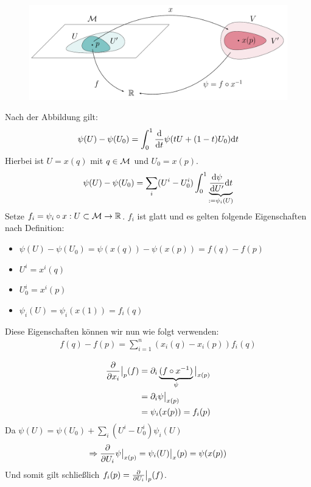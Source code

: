 \begin{bew} \leavevmode

\begin{figure}[H]
\centering
\includegraphics[width=1\linewidth]{figures/tikz/lemma_tangentialvectors.pdf}
\label{img:lemmaDarstellungBasisTPM}
\end{figure}

Nach der Abbildung gilt:
\begin{align}
\psi(U) - \psi(U_0) = \int^1_0 \dv{t} \psi(t U + (1- t) U_0) \dd t
\end{align}
Hierbei ist $U=x(q)$ mit $q \in \mathcal{M}$ und $U_0 = x(p)$.
\begin{align}
\psi(U) - \psi(U_0) = \sum_i (U^i- U^i_0) \int^1_0 \underbrace{\dv{\psi}{U'} (t U + (1 - t) U_0) \dd t}_{:= \psi_i (U)}
\end{align}
Setze $f_i = \psi_i \circ x : U \subset \mathcal{M} \to \mathbb{R}$.
$f_i$ ist glatt und es gelten folgende Eigenschaften nach Definition:
\begin{itemize}
\item $\psi(U)- \psi(U_0) = \psi(x(q)) - \psi(x(p)) = f(q)- f(p)$
\item $U^i = x^i (q)$
\item $U_0^i = x^i(p)$
\item $\psi_i (U) = \psi_i (x(1)) = f_i(q)$
\end{itemize}
Diese Eigenschaften können wir nun wie folgt verwenden:
\begin{align}
f(q)- f(p) = \sum_{i=1}^n (x_i (q) - x_i (p)) f_i(q)
\end{align}

\begin{align}
\pdv{x_i}\big\vert_{p} (f) &= \partial_i \underbrace{(f \circ x^{-1})}_{\psi} \big \vert_{x(p)} \\
&= \partial_i \psi \big\vert_{x(p)}\\
&= \psi_i (x(p)) = f_i (p)
\end{align}
Da $\psi(U) = \psi(U_0) + \sum_i (U^i - U^i_0)\psi_i(U)$
\begin{align}
\Rightarrow \pdv{U_i} \psi \big\vert_{x(p)} = \psi_i(U) \big\vert_x(p) = \psi(x(p))
\end{align}
Und somit gilt schließlich $f_i (p) = \pdv{U_i} \big\vert_p (f)$.
\end{bew}

